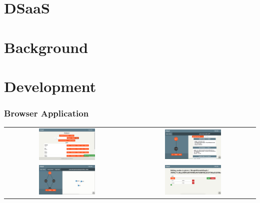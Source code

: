 \documentclass[10pt]{beamer}
\begin{document}
\section{DSaaS}

\maketitle






\section{Background}



\section{Development}

\begin{frame}[fragile]
	\frametitle{Browser Application}
	\centering
		\begin{tabular}{c c}
		\includegraphics[width=0.47\textwidth]{images/workspace.png} &
		\includegraphics[width=0.47\textwidth]{images/map.png} \\
		\includegraphics[width=0.47\textwidth]{images/graph.png} &
		\includegraphics[width=0.47\textwidth]{images/edit.png}
	\end{tabular}
\end{frame}
% 
% 



% 
\end{document}
